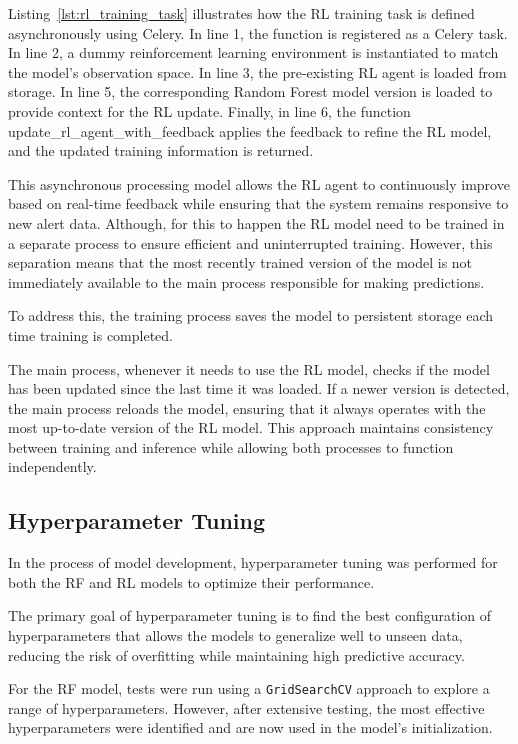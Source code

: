 Listing~\ref{lst:rl_training_task} illustrates how the RL training task is defined asynchronously using Celery. 
In line 1, the function is registered as a Celery task. 
In line 2, a dummy reinforcement learning environment is instantiated to match the model's observation space. 
In line 3, the pre-existing RL agent is loaded from storage. 
In line 5, the corresponding Random Forest model version is loaded to provide context for the RL update. 
Finally, in line 6, the function update\_rl\_agent\_with\_feedback applies the feedback to refine the RL model, and the updated training information is returned.

This asynchronous processing model allows the RL agent to continuously improve based on real-time feedback while ensuring that the system remains responsive to new alert data.
Although, for this to happen the RL model need to be trained in a separate process to ensure efficient and uninterrupted training. 
However, this separation means that the most recently trained version of the model is not immediately available to the main process responsible for making predictions. 

To address this, the training process saves the model to persistent storage each time training is completed. 

The main process, whenever it needs to use the RL model, checks if the model has been updated since the last time it was loaded. 
If a newer version is detected, the main process reloads the model, ensuring that it always operates with the most up-to-date version of the RL model.
This approach maintains consistency between training and inference while allowing both processes to function independently.

\subsection{Hyperparameter Tuning}

In the process of model development, hyperparameter tuning was performed for both the \gls{RF} and \gls{RL} models to optimize their performance. 

The primary goal of hyperparameter tuning is to find the best configuration of hyperparameters that allows the models to generalize well to unseen data, reducing the risk of overfitting while maintaining high predictive accuracy.

For the \gls{RF} model, tests were run using a \texttt{GridSearchCV} approach to explore a range of hyperparameters. 
However, after extensive testing, the most effective hyperparameters were identified and are now used in the model's initialization. 

